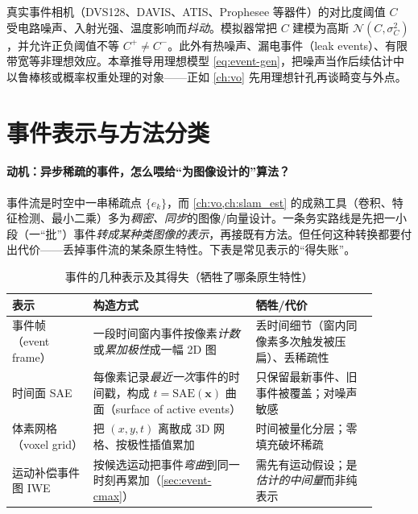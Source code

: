 \begin{note}
真实事件相机（DVS128、DAVIS、ATIS、Prophesee 等器件\cite{gallego2022eventsurvey}）的对比度阈值 $C$ 受电路噪声、入射光强、温度影响而\emph{抖动}。模拟器常把 $C$ 建模为高斯 $\mathcal N(C,\sigma_C^2)$，并允许正负阈值不等 $C^+\ne C^-$\cite{rebecq2018esim}。此外有热噪声、漏电事件（leak events）、有限带宽等非理想效应。本章推导用理想模型 \cref{eq:event-gen}，把噪声当作后续估计中以鲁棒核或概率权重处理的对象——正如 \cref{ch:vo} 先用理想针孔再谈畸变与外点。
\end{note}

\section{事件表示与方法分类}
\label{sec:event-repr}

\paragraph{动机：异步稀疏的事件，怎么喂给“为图像设计的”算法？}
事件流是时空中一串稀疏点 $\{e_k\}$，而 \cref{ch:vo,ch:slam_est} 的成熟工具（卷积、特征检测、最小二乘）多为\emph{稠密、同步}的图像/向量设计。一条务实路线是先把一小段（一“批”）事件\emph{转成某种类图像的表示}，再接既有方法。但任何这种转换都要付出代价——丢掉事件流的某条原生特性。下表是常见表示的“得失账”。

\begin{table}[H]\centering\small
\caption{事件的几种表示及其得失（牺牲了哪条原生特性）}
\label{tab:event-repr}
\begin{tabular}{p{0.20\linewidth}p{0.40\linewidth}p{0.30\linewidth}}
\toprule
表示 & 构造方式 & 牺牲/代价 \\
\midrule
事件帧（event frame）& 一段时间窗内事件按像素\emph{计数}或\emph{累加极性}成一幅 2D 图 & 丢时间细节（窗内同像素多次触发被压扁）、丢稀疏性 \\
时间面 SAE & 每像素记录\emph{最近一次}事件的时间戳，构成 $t=\mathrm{SAE}(\mathbf x)$ 曲面（surface of active events）& 只保留最新事件、旧事件被覆盖；对噪声敏感 \\
体素网格（voxel grid）& 把 $(x,y,t)$ 离散成 3D 网格、按极性插值累加 & 时间被量化分层；零填充破坏稀疏 \\
运动补偿事件图 IWE & 按候选运动把事件\emph{弯曲}到同一时刻再累加（\cref{sec:event-cmax}）& 需先有运动假设；是\emph{估计的中间量}而非纯表示 \\
\bottomrule
\end{tabular}
\end{table}

